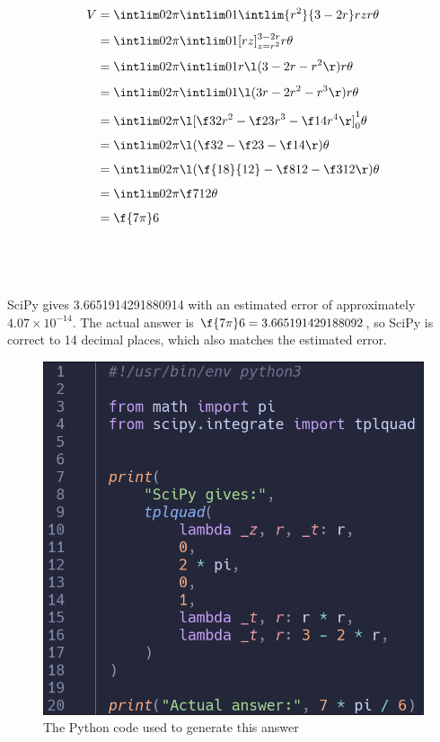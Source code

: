 \documentclass[a4paper]{article}
\begin{document}
\begin{align*}
V &= \intlim 0{2\pi} {\intlim 01 {\intlim {r^2}{3-2r} r z} r} \theta\\[1ex]
&= \intlim 0{2\pi} {\intlim 01 {[rz]_{z=r^2}^{3-2r}} r} \theta\\[1ex]
&= \intlim 0{2\pi} {\intlim 01 {r \l( 3 - 2r - r^2 \r)} r} \theta\\[1ex]
&= \intlim 0{2\pi} {\intlim 01 {\l( 3r - 2r^2 - r^3 \r)} r} \theta\\[1ex]
&= \intlim 0{2\pi} {\l[ \f32 r^2 - \f23 r^3 - \f14 r^4 \r]_0^1} \theta\\[1ex]
&= \intlim 0{2\pi} {\l( \f32 - \f23 - \f14 \r)} \theta\\[1ex]
&= \intlim 0{2\pi} {\l( \f{18}{12} - \f8{12} - \f3{12} \r)} \theta\\[1ex]
&= \intlim 0{2\pi} {\f7{12}} \theta\\[1ex]
&= \f{7\pi}6
\end{align*}

\subsection{~}

SciPy gives 3.6651914291880914 with an estimated error of approximately $4.07 \times 10^{-14}$. The actual answer is $\f{7\pi}6 = 3.665191429188092$, so SciPy is correct to 14 decimal places, which also matches the estimated error.

\begin{figure}[h]
	\centering
	\includegraphics[scale=0.35]{Q3-code}
	\caption{The Python code used to generate this answer}
\end{figure}

\end{document}
